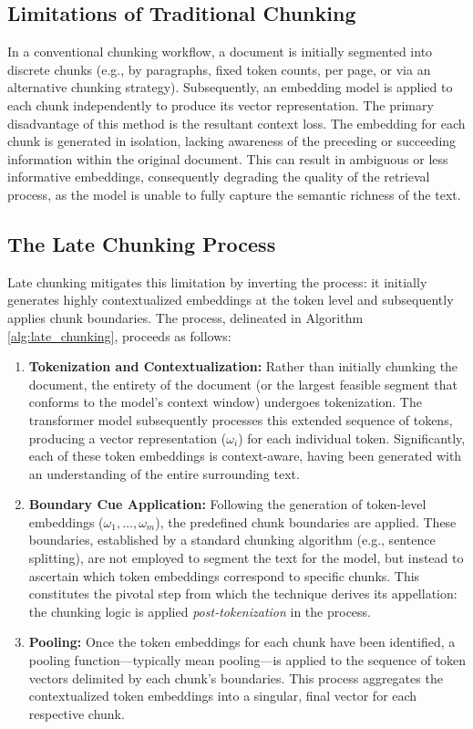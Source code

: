 \subsection{Limitations of Traditional Chunking}
In a conventional chunking workflow, a document is initially segmented into discrete chunks (e.g., by paragraphs, fixed token counts, per page, or via an alternative chunking strategy). Subsequently, an embedding model is applied to each chunk independently to produce its vector representation. The primary disadvantage of this method is the resultant context loss. The embedding for each chunk is generated in isolation, lacking awareness of the preceding or succeeding information within the original document. This can result in ambiguous or less informative embeddings, consequently degrading the quality of the retrieval process, as the model is unable to fully capture the semantic richness of the text.

\subsection{The Late Chunking Process}
Late chunking mitigates this limitation by inverting the process: it initially generates highly contextualized embeddings at the token level and subsequently applies chunk boundaries. The process, delineated in Algorithm \ref{alg:late_chunking}, proceeds as follows:

\begin{enumerate}
    \item \textbf{Tokenization and Contextualization:} Rather than initially chunking the document, the entirety of the document (or the largest feasible segment that conforms to the model's context window) undergoes tokenization. The transformer model subsequently processes this extended sequence of tokens, producing a vector representation ($\omega_i$) for each individual token. Significantly, each of these token embeddings is context-aware, having been generated with an understanding of the entire surrounding text.

    \item \textbf{Boundary Cue Application:} Following the generation of token-level embeddings ($\omega_1, \dots, \omega_m$), the predefined chunk boundaries are applied. These boundaries, established by a standard chunking algorithm (e.g., sentence splitting), are not employed to segment the text for the model, but instead to ascertain which token embeddings correspond to specific chunks. This constitutes the pivotal step from which the technique derives its appellation: the chunking logic is applied \textit{post-tokenization} in the process.

    \item \textbf{Pooling:} Once the token embeddings for each chunk have been identified, a pooling function—typically mean pooling—is applied to the sequence of token vectors delimited by each chunk's boundaries. This process aggregates the contextualized token embeddings into a singular, final vector for each respective chunk.
\end{enumerate}

